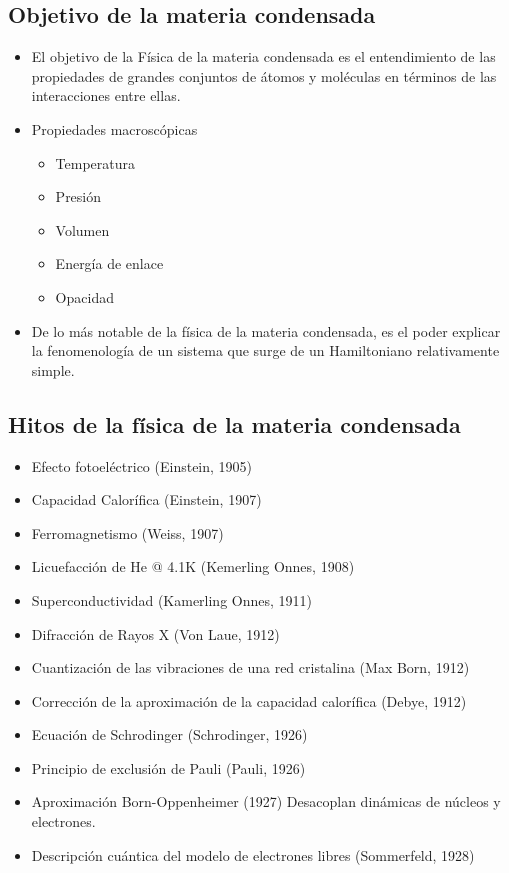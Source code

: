 \subsection{Objetivo de la materia condensada}
\begin{itemize}
    \item El objetivo de la Física de la materia condensada es el entendimiento de las propiedades de grandes conjuntos de átomos y moléculas en términos de las interacciones entre ellas.
    \item Propiedades macroscópicas
    \begin{itemize}
        \item Temperatura
        \item Presión
        \item Volumen
        \item Energía de enlace
        \item Opacidad
    \end{itemize}
    \item De lo más notable de la física de la materia condensada, es el poder explicar la fenomenología de un sistema que surge de un Hamiltoniano relativamente simple.
\end{itemize}

\subsection{Hitos de la física de la materia condensada}

\begin{itemize}
    \item Efecto fotoeléctrico (Einstein, 1905)
    \item Capacidad Calorífica (Einstein, 1907)
    \item Ferromagnetismo (Weiss, 1907)
    \item Licuefacción de He @ 4.1K (Kemerling Onnes, 1908)
    \item Superconductividad (Kamerling Onnes, 1911) 
    \item Difracción de Rayos X (Von Laue, 1912)
    \item Cuantización de las vibraciones de una red cristalina (Max Born, 1912)
    \item Corrección de la aproximación de la capacidad calorífica (Debye, 1912)
    \item Ecuación de Schrodinger (Schrodinger, 1926)
    \item Principio de exclusión de Pauli (Pauli, 1926)
    \item Aproximación Born-Oppenheimer (1927) Desacoplan dinámicas de núcleos y electrones.
    \item Descripción cuántica del modelo de electrones libres (Sommerfeld, 1928)
\end{itemize}

